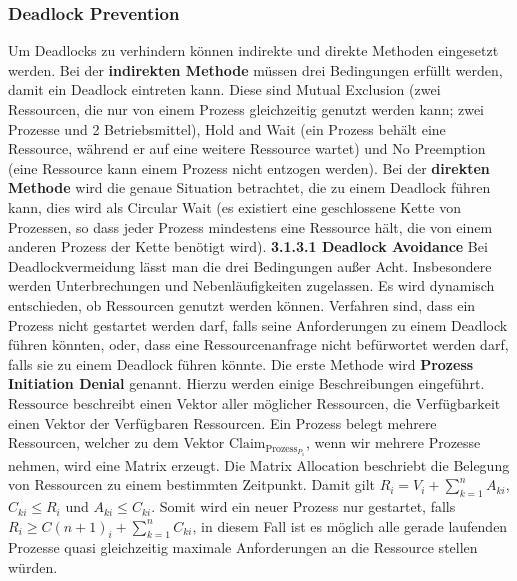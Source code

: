 \documentclass{article}
\begin{document}
\subsubsection{Deadlock Prevention}
    Um Deadlocks zu verhindern können indirekte und direkte Methoden eingesetzt werden.\newline
    Bei der \textbf{indirekten Methode} müssen drei Bedingungen erfüllt werden, damit ein Deadlock eintreten kann. Diese sind Mutual Exclusion (zwei Ressourcen, die nur von einem Prozess gleichzeitig genutzt werden kann; zwei Prozesse und 2 Betriebsmittel), Hold and Wait (ein Prozess behält eine Ressource, während er auf eine weitere Ressource wartet) und No Preemption (eine Ressource kann einem Prozess nicht entzogen werden).\newline
    Bei der \textbf{direkten Methode} wird die genaue Situation betrachtet, die zu einem Deadlock führen kann, dies wird als Circular Wait (es existiert eine geschlossene Kette von Prozessen, so dass jeder Prozess mindestens eine Ressource hält, die von einem anderen Prozess der Kette benötigt wird).\newline
    \textbf{3.1.3.1 Deadlock Avoidance}\newline
    Bei Deadlockvermeidung lässt man die drei Bedingungen außer Acht. Insbesondere werden Unterbrechungen und Nebenläufigkeiten zugelassen. Es wird dynamisch entschieden, ob Ressourcen genutzt werden können. Verfahren sind, dass ein Prozess nicht gestartet werden darf, falls seine Anforderungen zu einem Deadlock führen könnten, oder, dass eine Ressourcenanfrage nicht befürwortet werden darf, falls sie zu einem Deadlock führen könnte.\newline
    Die erste Methode wird \textbf{Prozess Initiation Denial} genannt. Hierzu werden einige Beschreibungen eingeführt. $\text{Ressource}$ beschreibt einen Vektor aller möglicher Ressourcen, die $\text{Verfügbarkeit}$ einen Vektor der Verfügbaren Ressourcen. Ein Prozess belegt mehrere Ressourcen, welcher zu dem Vektor $\text{Claim}_{\text{Prozess}_{P_1}}$, wenn wir mehrere Prozesse nehmen, wird eine Matrix erzeugt. Die Matrix $\text{Allocation}$ beschriebt die Belegung von Ressourcen zu einem bestimmten Zeitpunkt.\newline
    Damit gilt $R_i= V_i + \sum_{k=1}^n A_{ki}$, $C_{ki}\leq R_i$ und $A_{ki}\leq C_{ki}$.
    Somit wird ein neuer Prozess nur gestartet, falls $R_i\geq C{(n+1)_i}+\sum_{k=1}^n C_{ki}$, in diesem Fall ist es möglich alle gerade laufenden Prozesse quasi gleichzeitig maximale Anforderungen an die Ressource stellen würden.\newline
\end{document}
